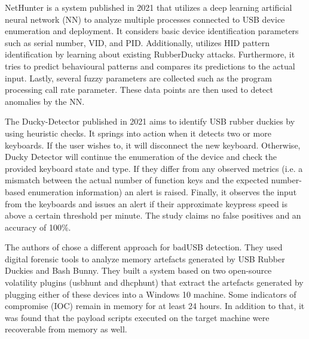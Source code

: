 NetHunter \cite{IntelligentSystemPreventing} is a system published in 2021 that utilizes a deep learning artificial neural network (NN) to analyze multiple processes connected to USB device enumeration and deployment. It considers basic device identification parameters such as serial number, VID, and PID. Additionally, utilizes HID pattern identification by learning about existing RubberDucky attacks. Furthermore, it tries to predict behavioural patterns and compares its predictions to the actual input. Lastly, several fuzzy parameters are collected such as the program processing call rate parameter. These data points are then used to detect anomalies by the NN.


The Ducky-Detector \cite{USBRubberDucky2021} published in 2021 aims to identify USB rubber duckies by using heuristic checks. It springs into action when it detects two or more keyboards. If the user wishes to, it will disconnect the new keyboard. Otherwise, Ducky Detector will continue the enumeration of the device and check the provided keyboard state and type. If they differ from any observed metrics (i.e. a mismatch between the actual number of function keys and the expected number-based enumeration information) an alert is raised. Finally, it observes the input from the keyboards and issues an alert if their approximate keypress speed is above a certain threshold per minute. The study claims no false positives and an accuracy of 100\%. 

The authors of \cite{thomasDuckHuntMemory2021} chose a different approach for badUSB detection. They used digital forensic tools to analyze memory artefacts generated by USB Rubber Duckies and Bash Bunny. They built a system based on two open-source volatility plugins (usbhunt and dhcphunt) that extract the artefacts generated by plugging either of these devices into a Windows 10 machine. Some indicators of compromise (IOC) remain in memory for at least 24 hours. In addition to that, it was found that the payload scripts executed on the target machine were recoverable from memory as well. 
\newpage

